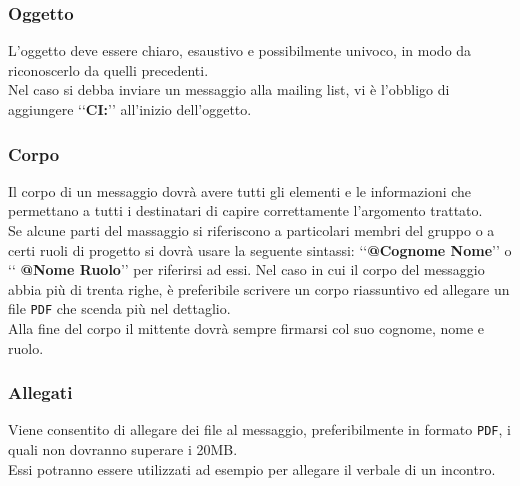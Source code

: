 \subsubsection{Oggetto}
\label{oggetto}
L'oggetto deve essere chiaro, esaustivo e possibilmente univoco, in modo da riconoscerlo da quelli precedenti.
\\Nel caso si debba inviare un messaggio alla mailing list\glossario{}, vi è l'obbligo di aggiungere \lq\lq\textbf{CI:}\rq\rq{} all'inizio dell'oggetto. 

\subsubsection{Corpo}
\label{corpo}
Il corpo di un messaggio dovrà avere tutti gli elementi e le informazioni che permettano a tutti i destinatari di capire correttamente l'argomento trattato.
\\Se alcune parti del massaggio si riferiscono a particolari membri del gruppo o a certi ruoli di progetto si dovrà usare la seguente sintassi: \lq\lq{}\textbf{@Cognome Nome}\rq\rq{} o 
\lq\lq{} \textbf{@Nome Ruolo}\rq\rq{} per riferirsi ad essi.
Nel caso in cui il corpo del messaggio abbia più di trenta righe, è preferibile scrivere un corpo riassuntivo ed allegare un file \verb!PDF!\glossario{} che scenda più nel dettaglio.
\\Alla fine del corpo il mittente dovrà sempre firmarsi col suo cognome, nome e ruolo.

\subsubsection{Allegati}
\label{allegati}
Viene consentito di allegare dei file al messaggio, preferibilmente in formato \verb!PDF!\glossario{}, i quali non dovranno superare i 20MB.
\\Essi potranno essere utilizzati ad esempio per allegare il verbale di un incontro.